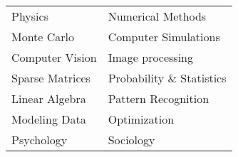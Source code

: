 \begin{tabular}{ l l}
Physics             & Numerical Methods         \\
Monte Carlo         & Computer Simulations     \\ 
Computer Vision     & Image processing          \\
Sparse Matrices     & Probability \& Statistics \\
Linear Algebra      & Pattern Recognition      \\   
Modeling Data       & Optimization              \\
Psychology          & Sociology \\
\end{tabular}\\
